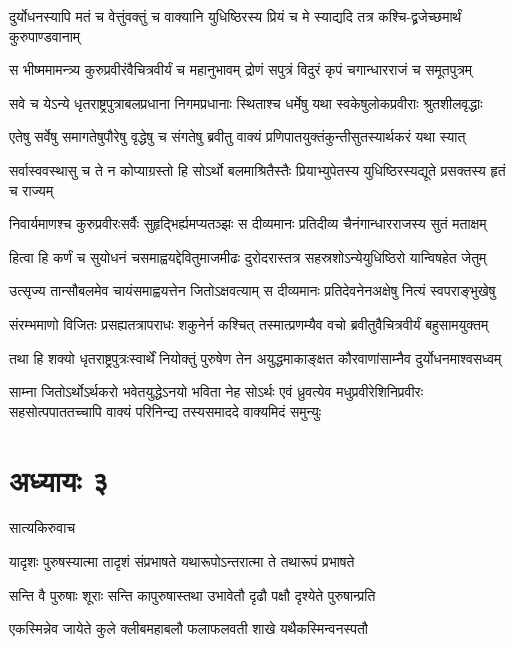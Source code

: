 \twolineshloka
{दुर्योधनस्यापि मतं च वेत्तुंवक्तुं च वाक्यानि युधिष्ठिरस्य}
{प्रियं च मे स्याद्यदि तत्र कश्चि-द्व्रजेच्छमार्थं कुरुपाण्डवानाम्}


\twolineshloka
{स भीष्ममामन्त्र्य कुरुप्रवीरंवैचित्रवीर्यं च महानुभावम्}
{द्रोणं सपुत्रं विदुरं कृपं चगान्धारराजं च समूतपुत्रम्}


\twolineshloka
{सवे च येऽन्ये धृतराष्ट्रपुत्राबलप्रधाना निगमप्रधानाः}
{स्थिताश्च धर्मेषु यथा स्वकेषुलोकप्रवीराः श्रुतशीलवृद्धाः}


\twolineshloka
{एतेषु सर्वेषु समागतेषुपौरेषु वृद्धेषु च संगतेषु}
{ब्रवीतु वाक्यं प्रणिपातयुक्तंकुन्तीसुतस्यार्थकरं यथा स्यात्}


\twolineshloka
{सर्वास्ववस्थासु च ते न कोप्याग्रस्तो हि सोऽर्थो बलमाश्रितैस्तैः}
{प्रियाभ्युपेतस्य युधिष्ठिरस्यद्यूते प्रसक्तस्य हृतं च राज्यम्}


\twolineshloka
{निवार्यमाणश्च कुरुप्रवीरःसर्वैः सुहृद्भिर्ह्यमप्यतञ्झः}
{स दीव्यमानः प्रतिदीव्य चैनंगान्धारराजस्य सुतं मताक्षम्}


\twolineshloka
{हित्वा हि कर्णं च सुयोधनं चसमाह्वयद्देवितुमाजमीढः}
{दुरोदरास्तत्र सहस्रशोऽन्येयुधिष्ठिरो यान्विषहेत जेतुम्}


\twolineshloka
{उत्सृज्य तान्सौबलमेव चायंसमाह्वयत्तेन जितोऽक्षवत्याम्}
{स दीव्यमानः प्रतिदेवनेनअक्षेषु नित्यं स्वपराङ्भुखेषु}


\twolineshloka
{संरम्भमाणो विजितः प्रसह्यतत्रापराधः शकुनेर्न कश्चित्}
{तस्मात्प्रणम्यैव वचो ब्रवीतुवैचित्रवीर्यं बहुसामयुक्तम्}


\twolineshloka
{तथा हि शक्यो धृतराष्ट्रपुत्रःस्वार्थें नियोक्तुं पुरुषेण तेन}
{अयुद्धमाकाङ्क्षत कौरवाणांसाम्नैव दुर्योधनमाश्वसध्वम्}


साम्ना जितोऽर्थोऽर्थकरो भवेतयुद्धेऽनयो भविता नेह सोऽर्थः
एवं ध्रुवत्येव मधुप्रवीरेशिनिप्रवीरः सहसोत्पपाततच्चापि वाक्यं परिनिन्द्य तस्यसमाददे वाक्यमिदं समुन्युः

\chapter{अध्यायः ३}
\twolineshloka
{सात्यकिरुवाच}
{}


\twolineshloka
{यादृशः पुरुषस्यात्मा तादृशं संप्रभाषते}
{यथारूपोऽन्तरात्मा ते तथारूपं प्रभाषते}


\twolineshloka
{सन्ति वै पुरुषाः शूराः सन्ति कापुरुषास्तथा}
{उभावेतौ दृढौ पक्षौ दृश्येते पुरुषान्प्रति}


\twolineshloka
{एकस्मिन्नेव जायेते कुले क्लीबमहाबलौ}
{फलाफलवती शाखे यथैकस्मिन्वनस्पतौ}


